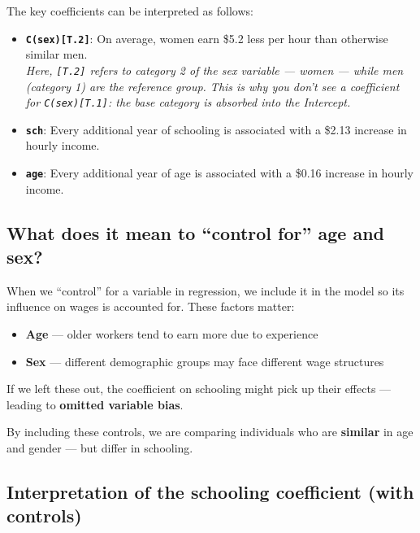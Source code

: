 \documentclass[
  letterpaper,
  DIV=11,
  numbers=noendperiod]{scrreprt}
\providecommand{\tightlist}{%
  \setlength{\itemsep}{0pt}\setlength{\parskip}{0pt}}\usepackage{longtable,booktabs,array}
\begin{document}
The key coefficients can be interpreted as follows:

\begin{itemize}
\item
  \textbf{\texttt{C(sex){[}T.2{]}}}: On average, women earn \$5.2 less
  per hour than otherwise similar men.\\
  \emph{Here, \texttt{{[}T.2{]}} refers to category 2 of the sex
  variable --- women --- while men (category 1) are the reference group.
  This is why you don't see a coefficient for \texttt{C(sex){[}T.1{]}}:
  the base category is absorbed into the Intercept.}
\item
  \textbf{\texttt{sch}}: Every additional year of schooling is
  associated with a \$2.13 increase in hourly income.
\item
  \textbf{\texttt{age}}: Every additional year of age is associated with
  a \$0.16 increase in hourly income.
\end{itemize}

\hypertarget{what-does-it-mean-to-control-for-age-and-sex}{%
\subsection{What does it mean to ``control for'' age and
sex?}\label{what-does-it-mean-to-control-for-age-and-sex}}

When we ``control'' for a variable in regression, we include it in the
model so its influence on wages is accounted for. These factors matter:

\begin{itemize}
\tightlist
\item
  \textbf{Age} --- older workers tend to earn more due to experience\\
\item
  \textbf{Sex} --- different demographic groups may face different wage
  structures
\end{itemize}

If we left these out, the coefficient on schooling might pick up their
effects --- leading to \textbf{omitted variable bias}.

By including these controls, we are comparing individuals who are
\textbf{similar} in age and gender --- but differ in schooling.

\hypertarget{interpretation-of-the-schooling-coefficient-with-controls}{%
\subsection{Interpretation of the schooling coefficient (with
controls)}\label{interpretation-of-the-schooling-coefficient-with-controls}}
\end{document}
